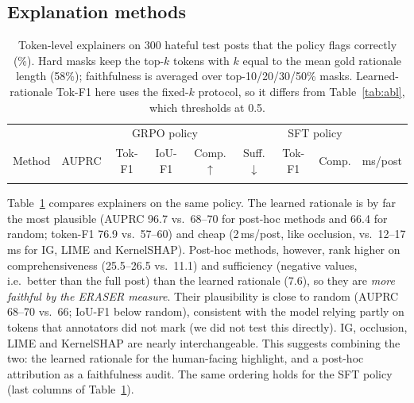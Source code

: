 \documentclass[11pt]{article}
\begin{document}
\subsection{Explanation methods}
\begin{table}[t]
\centering\small\setlength{\tabcolsep}{3.4pt}
\begin{tabular}{lccccc|ccc}
\toprule
& \multicolumn{5}{c|}{GRPO policy} & \multicolumn{2}{c}{SFT policy} & \\
Method & AUPRC & Tok-F1 & IoU-F1 & Comp.$\uparrow$ & Suff.$\downarrow$ & Tok-F1 & Comp. & ms/post\\
\midrule
\\
\bottomrule
\end{tabular}
\caption{Token-level explainers on 300 hateful test posts that the policy flags correctly (\%). Hard masks keep the top-$k$ tokens with $k$ equal to the mean gold rationale length (58\%);
faithfulness is averaged over top-10/20/30/50\% masks. Learned-rationale Tok-F1 here uses the fixed-$k$ protocol, so it differs from Table~\ref{tab:abl}, which thresholds at 0.5.}
\label{tab:xai}
\end{table}
Table~\ref{tab:xai} compares explainers on the same policy. The learned rationale is by far the most plausible (AUPRC 96.7 vs.\ 68--70 for post-hoc methods and 66.4 for random; token-F1 76.9 vs.\ 57--60)
and cheap (2\,ms/post, like occlusion, vs.\ 12--17\,ms for IG, LIME and KernelSHAP). Post-hoc methods, however, rank higher on comprehensiveness (25.5--26.5 vs.\ 11.1) and sufficiency (negative values, i.e.\ better than the full post) than the learned rationale (7.6),
so they are \emph{more faithful by the ERASER measure}. Their plausibility is close to random (AUPRC 68--70 vs.\ 66; IoU-F1 below random), consistent with the model relying partly on tokens that annotators did not mark (we did not test this directly). IG, occlusion, LIME and KernelSHAP are nearly interchangeable. This suggests combining the two:
the learned rationale for the human-facing highlight, and a post-hoc attribution as a faithfulness audit. The same ordering holds for the SFT policy (last columns of Table~\ref{tab:xai}).
\end{document}
